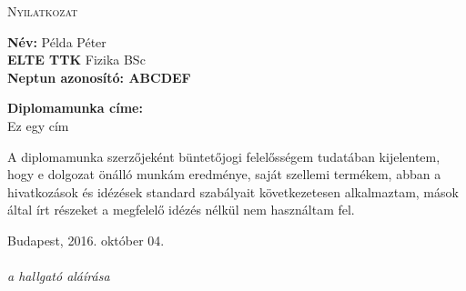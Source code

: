 \newpage
\thispagestyle{empty}
\begin{center}
\Large{ \textsc{Nyilatkozat} }
\end{center}

\vspace*{1cm}
\noindent \textbf{Név:} Példa Péter\\
\textbf{ELTE TTK} Fizika BSc \\
\textbf{Neptun azonosító: ABCDEF} 

\vspace*{0.5cm}
\noindent \textbf{Diplomamunka címe:} \\
Ez egy cím

\vspace*{2.5cm}
A diplomamunka szerzőjeként büntetőjogi felelősségem tudatában kijelentem, hogy e dolgozat önálló munkám eredménye, saját szellemi termékem, abban a hivatkozások és idézések standard szabályait következetesen alkalmaztam, mások által írt részeket a megfelelő idézés nélkül nem használtam fel.

\vspace*{4.5cm}
\noindent Budapest, 2016. október 04. \\
\hspace*{10.0cm}{........................................}\\[2ex]
\hspace*{10cm}\emph{a hallgató aláírása}
